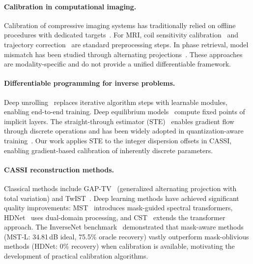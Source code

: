 \documentclass[runningheads]{llncs}
\begin{document}
\paragraph{Calibration in computational imaging.}
Calibration of compressive imaging systems has traditionally relied on offline procedures with dedicated targets~\cite{arguello2013cassi_calib}.
For MRI, coil sensitivity calibration~\cite{uecker2014espirit} and trajectory correction~\cite{deshmane2012parallel} are standard preprocessing steps.
In phase retrieval, model mismatch has been studied through alternating projections~\cite{elser2003phase}.
These approaches are modality-specific and do not provide a unified differentiable framework.

\paragraph{Differentiable programming for inverse problems.}
Deep unrolling~\cite{monga2021unrolled} replaces iterative algorithm steps with learnable modules, enabling end-to-end training.
Deep equilibrium models~\cite{gilton2021deep_eq} compute fixed points of implicit layers.
The straight-through estimator (STE)~\cite{bengio2013ste} enables gradient flow through discrete operations and has been widely adopted in quantization-aware training~\cite{jacob2018quantization}.
Our work applies STE to the integer dispersion offsets in CASSI, enabling gradient-based calibration of inherently discrete parameters.

\paragraph{CASSI reconstruction methods.}
Classical methods include GAP-TV~\cite{yuan2016gaptv} (generalized alternating projection with total variation) and TwIST~\cite{bioucas2007twist}.
Deep learning methods have achieved significant quality improvements: MST~\cite{cai2022mst} introduces mask-guided spectral transformers, HDNet~\cite{hu2022hdnet} uses dual-domain processing, and CST~\cite{cai2022cst} extends the transformer approach.
The InverseNet benchmark~\cite{yang2025inversenet} demonstrated that mask-aware methods (MST-L: 34.81\,dB ideal, 75.5\% oracle recovery) vastly outperform mask-oblivious methods (HDNet: 0\% recovery) when calibration is available, motivating the development of practical calibration algorithms.

\end{document}
